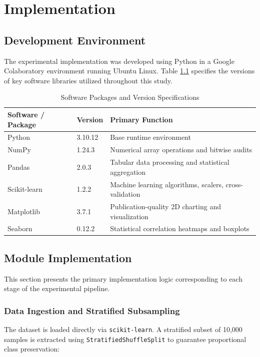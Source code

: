 \chapter{Implementation}
\label{ch:implementation}

\section{Development Environment}
\label{sec:dev_environment}

The experimental implementation was developed using Python in a Google Colaboratory environment running Ubuntu Linux. Table \ref{tab:software_stack} specifies the versions of key software libraries utilized throughout this study.

\begin{table}[H]
\centering
\caption{Software Packages and Version Specifications}
\label{tab:software_stack}
\begin{tabular}{lll}
\toprule
\textbf{Software / Package} & \textbf{Version} & \textbf{Primary Function} \\
\midrule
Python & 3.10.12 & Base runtime environment \\
NumPy & 1.24.3 & Numerical array operations and bitwise audits \\
Pandas & 2.0.3 & Tabular data processing and statistical aggregation \\
Scikit-learn & 1.2.2 & Machine learning algorithms, scalers, cross-validation \\
Matplotlib & 3.7.1 & Publication-quality 2D charting and visualization \\
Seaborn & 0.12.2 & Statistical correlation heatmaps and boxplots \\
\bottomrule
\end{tabular}
\end{table}

\section{Module Implementation}
\label{sec:module_implementation}

This section presents the primary implementation logic corresponding to each stage of the experimental pipeline.

\subsection{Data Ingestion and Stratified Subsampling}
The dataset is loaded directly via \texttt{scikit-learn}. A stratified subset of 10,000 samples is extracted using \texttt{StratifiedShuffleSplit} to guarantee proportional class preservation:

